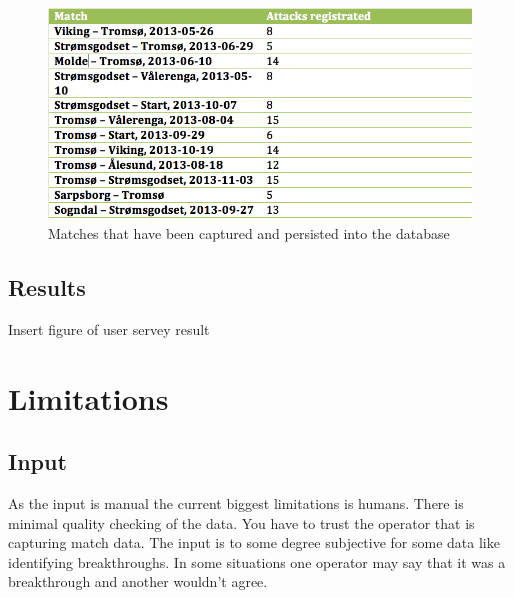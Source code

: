 \begin{figure}[ht!]
\centering
\includegraphics[width=1\textwidth]{images/general/matched_regged.png}
\caption{Matches that have been captured and persisted into the database}
\label{fig:matches_regged}
\end{figure}

\subsection{Results}

Insert figure of user servey result

\section{Limitations}

\subsection{Input}
As the input is manual the current biggest limitations is humans. There is minimal quality checking of the data. You have to trust the operator that is capturing match data. The input is to some degree subjective for some data like identifying breakthroughs. In some situations one operator may say that it was a breakthrough and another wouldn’t agree.

